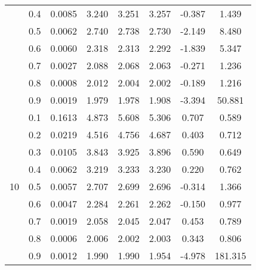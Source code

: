 \documentclass[11pt,a4paper]{report}
\begin{document}
\begin{longtable}{ | c | c || c | c | c | c | c | c | }
 & 0.4 & 0.0085 & 3.240 & 3.251 & 3.257 & -0.387 & 1.439 \\
 & 0.5 & 0.0062 & 2.740 & 2.738 & 2.730 & -2.149 & 8.480 \\
 & 0.6 & 0.0060 & 2.318 & 2.313 & 2.292 & -1.839 & 5.347 \\
 & 0.7 & 0.0027 & 2.088 & 2.068 & 2.063 & -0.271 & 1.236 \\
 & 0.8 & 0.0008 & 2.012 & 2.004 & 2.002 & -0.189 & 1.216 \\
 & 0.9 & 0.0019 & 1.979 & 1.978 & 1.908 & -3.394 & 50.881 \\
 \hline
\multirow{9}{*}{10} & 0.1 & 0.1613 & 4.873 & 5.608 & 5.306 & 0.707 & 0.589 \\
 & 0.2 & 0.0219 & 4.516 & 4.756 & 4.687 & 0.403 & 0.712 \\
 & 0.3 & 0.0105 & 3.843 & 3.925 & 3.896 & 0.590 & 0.649 \\
 & 0.4 & 0.0062 & 3.219 & 3.233 & 3.230 & 0.220 & 0.762 \\
 & 0.5 & 0.0057 & 2.707 & 2.699 & 2.696 & -0.314 & 1.366 \\
 & 0.6 & 0.0047 & 2.284 & 2.261 & 2.262 & -0.150 & 0.977 \\
 & 0.7 & 0.0019 & 2.058 & 2.045 & 2.047 & 0.453 & 0.789 \\
 & 0.8 & 0.0006 & 2.006 & 2.002 & 2.003 & 0.343 & 0.806 \\
 & 0.9 & 0.0012 & 1.990 & 1.990 & 1.954 & -4.978 & 181.315 \\
 \hline
\hline
\end{longtable}
\end{document}
